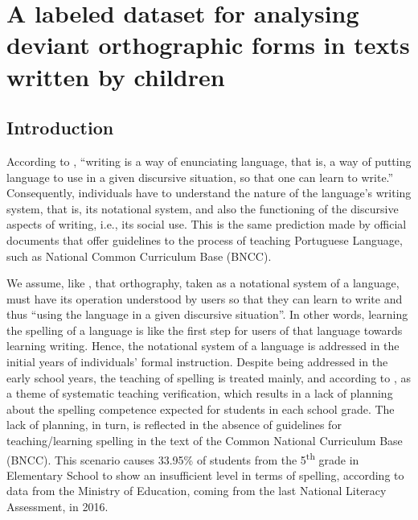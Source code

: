 \chapter{A labeled dataset for analysing deviant orthographic forms in texts written by children}\label{ch:adelaideherci15}
\begin{affils}
\end{affils}

\section{Introduction}

According to \citet{Chacon2018}, ``writing is a way of enunciating language, that is, a way of putting language to use in a given discursive situation, so that one can learn to write.'' Consequently, individuals have to understand the nature of the language's writing system, that is, its notational system, and also the functioning of the discursive aspects of writing, i.e., its social use. This is the same prediction made by official documents that offer guidelines to the process of teaching Portuguese Language, such as National Common Curriculum Base (BNCC).

We assume, like \citet{Chacon2018}, that orthography, taken as a notational system of a language, must have its operation understood by users so that they can learn to write and thus ``using the language in a given discursive situation''. In other words, learning the spelling of a language is like the first step for users of that language towards learning writing. Hence, the notational system of a language is addressed in the initial years of individuals' formal instruction. Despite being addressed in the early school years, the teaching of spelling is treated mainly, and according to \citet{Morais2000}, as a theme of systematic teaching verification, which results in a lack of planning about the spelling competence expected for students in each school grade. The lack of planning, in turn, is reflected in the absence of guidelines for teaching/learning spelling in the text of the Common National Curriculum Base (BNCC). This scenario causes 33.95\% of students from the 5\textsuperscript{th} grade in Elementary School to show an insufficient level in terms of spelling, according to data from the Ministry of Education, coming from the last National Literacy Assessment, in 2016.

